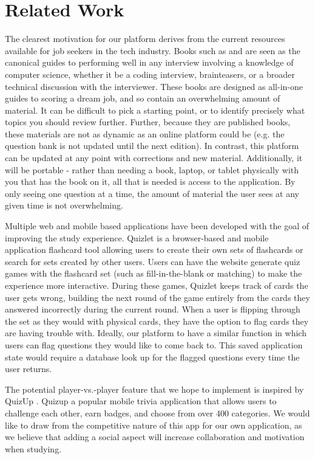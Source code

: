 \section{Related Work}

The clearest motivation for our platform derives from the current resources available for job seekers in the tech industry. Books such as \cite{McDowell} and \cite{EPI} are seen as the canonical guides to performing well in any interview involving a knowledge of computer science, whether it be a coding interview, brainteasers, or a broader technical discussion with the interviewer. These books are designed as all-in-one guides to scoring a dream job, and so contain an overwhelming amount of material. It can be difficult to pick a starting point, or to identify precisely what topics you should review further. Further, because they are published books, these materials are not as dynamic as an online platform could be (e.g. the question bank is not updated until the next edition). In contrast, this platform can be updated at any point with corrections and new material. Additionally, it will be portable - rather than needing a book, laptop, or tablet physically with you that has the book on it, all that is needed is access to the application. By only seeing one question at a time, the amount of material the user sees at any given time is not overwhelming.

Multiple web and mobile based applications have been developed with the goal of improving the study experience. Quizlet \cite{Quizlet} is a browser-based and mobile application  flashcard tool allowing users to create their own sets of flashcards or search for sets created by other users. Users can have the website generate quiz games with the flashcard set (such as fill-in-the-blank or matching) to make the experience more interactive. During these games, Quizlet keeps track of cards the user gets wrong, building the next round of the game entirely from the cards they answered incorrectly during the current round. When a user is flipping through the set as they would with physical cards, they have the option to flag cards they are having trouble with. Ideally, our platform to have a similar function in which users can flag questions they would like to come back to. This saved application state would require a database look up for the flagged questions every time the user returns.

The potential player-vs.-player feature that we hope to implement is inspired by QuizUp \cite{Quizup}. Quizup a popular mobile trivia application that allows users to challenge each other, earn badges, and choose from over 400 categories. We would like to draw from the competitive nature of this app for our own application, as we believe that adding a social aspect will increase collaboration and motivation when studying.